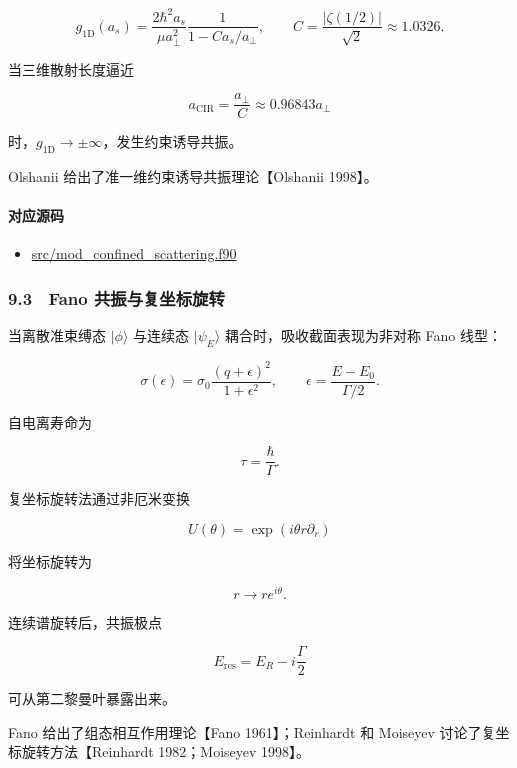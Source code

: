 \documentclass[
]{ctexbook}
\providecommand{\tightlist}{%
  \setlength{\itemsep}{0pt}\setlength{\parskip}{0pt}}
\begin{document}
\[
g_{\mathrm{1D}}(a_s)
=
\frac{2\hbar^2a_s}{\mu a_\perp^2}
\frac{1}{1-C a_s/a_\perp},
\qquad
C=\frac{|\zeta(1/2)|}{\sqrt2}\approx1.0326.
\]

当三维散射长度逼近

\[
a_{\mathrm{CIR}}=\frac{a_\perp}{C}
\approx0.96843a_\perp
\]

时，\(g_{\mathrm{1D}}\rightarrow\pm\infty\)，发生约束诱导共振。

Olshanii 给出了准一维约束诱导共振理论【Olshanii 1998】。

\hypertarget{ux5bf9ux5e94ux6e90ux7801-40}{%
\paragraph{对应源码}\label{ux5bf9ux5e94ux6e90ux7801-40}}

\begin{itemize}
\tightlist
\item
  \href{https://github.com/l1Ha/QuantumGeneralModule/blob/main/src/mod_confined_scattering.f90}{src/mod\_confined\_scattering.f90}
\end{itemize}

\hypertarget{fano-ux5171ux632fux4e0eux590dux5750ux6807ux65cbux8f6c}{%
\subsubsection{9.3　Fano
共振与复坐标旋转}\label{fano-ux5171ux632fux4e0eux590dux5750ux6807ux65cbux8f6c}}

当离散准束缚态 \(|\phi\rangle\) 与连续态 \(|\psi_E\rangle\)
耦合时，吸收截面表现为非对称 Fano 线型：

\[
\sigma(\epsilon)
=
\sigma_0\frac{(q+\epsilon)^2}{1+\epsilon^2},
\qquad
\epsilon=\frac{E-E_0}{\Gamma/2}.
\]

自电离寿命为

\[
\tau=\frac{\hbar}{\Gamma}.
\]

复坐标旋转法通过非厄米变换

\[
U(\theta)=\exp(i\theta r\partial_r)
\]

将坐标旋转为

\[
r\rightarrow re^{i\theta}.
\]

连续谱旋转后，共振极点

\[
E_{\mathrm{res}}=E_R-i\frac{\Gamma}{2}
\]

可从第二黎曼叶暴露出来。

Fano 给出了组态相互作用理论【Fano 1961】；Reinhardt 和 Moiseyev
讨论了复坐标旋转方法【Reinhardt 1982；Moiseyev 1998】。
\end{document}
